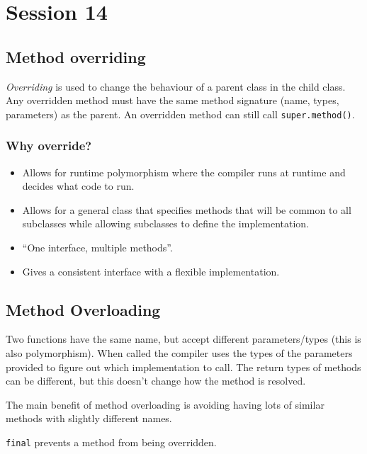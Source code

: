 \section{Session 14}\label{sec:session_14}

\subsection{Method overriding}\label{sub:method_overriding}

\emph{Overriding} is used to change the behaviour of a parent class in the child class.
Any overridden method must have the same method signature (name, types, parameters) as the parent.
An overridden method can still call \texttt{super.method()}.

\subsubsection{Why override?}\label{ssub:why_override_}

\begin{itemize}
	\item Allows for runtime polymorphism where the compiler runs at runtime and decides what code to run.
	\item Allows for a general class that specifies methods that will be common to all subclasses while allowing subclasses to define the implementation.
	\item ``One interface, multiple methods''.
	\item Gives a consistent interface with a flexible implementation.
\end{itemize}


\subsection{Method Overloading}\label{sub:method_overloading}

Two functions have the same name, but accept different parameters/types (this is also polymorphism).
When called the compiler uses the types of the parameters provided to figure out which implementation to call.
The return types of methods can be different, but this doesn't change how the method is resolved.

The main benefit of method overloading is avoiding having lots of similar methods with slightly different names.

\texttt{final} prevents a method from being overridden.

